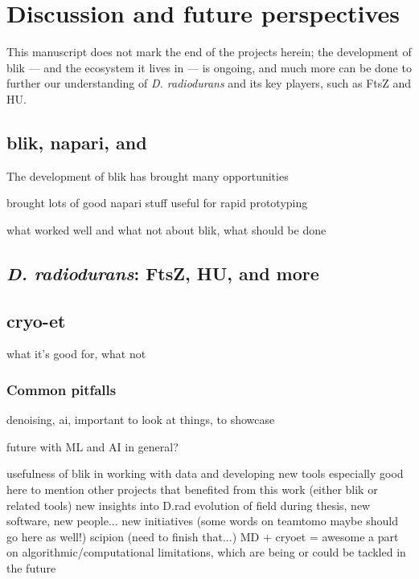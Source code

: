 \chapter{Discussion and future perspectives}\label{future}

This manuscript does not mark the end of the projects herein; the development of blik --- and the ecosystem it lives in --- is ongoing, and much more can be done to further our understanding of \textit{D. radiodurans} and its key players, such as FtsZ and HU.

\localtableofcontents

\section{blik, napari, and }

The development of blik has brought many opportunities

brought lots of good napari stuff
useful for rapid prototyping

what worked well and what not about blik, what should be done

\section{\textit{D. radiodurans}: FtsZ, HU, and more}


\section{cryo-et}

what it's good for, what not


\subsection{Common pitfalls}

denoising, ai, important to look at things, to showcase

future with ML and AI in general?


\begin{outline}
\1 usefulness of blik in working with data and developing new tools
    \2 especially good here to mention other projects that benefited from this work (either blik or related tools)
\1 new insights into D.rad
\1 evolution of field during thesis, new software, new people... new initiatives (some words on teamtomo maybe should go here as well!)
\1 scipion (need to finish that...)
\1 MD + cryoet = awesome
\1 a part on algorithmic/computational limitations, which are being or could be tackled in the future
\end{outline}
